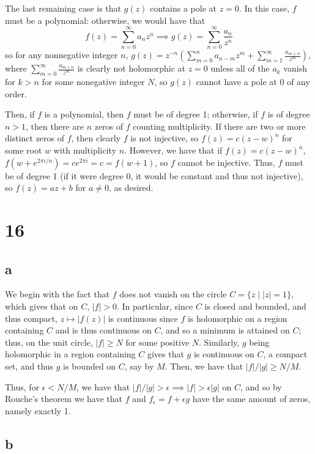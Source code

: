 \documentclass[12pt,letterpaper]{article}
\theoremstyle{definition}
\begin{document}
The last remaining case is that $g(z)$ contains a pole at $z = 0$. In this case, $f$ must be a polynomial: otherwise, we would have that
\[
  f(z) = \sum_{n=0}^{\infty}a_{n}z^{n} \implies g(z) = \sum_{n=0}^{\infty}\frac{a_{n}}{z^{n}}
\]
so for any nonnegative integer $n$, $g(z) = z^{-n}\left(\sum_{m=0}^{n}a_{n-m}z^{m} + \sum_{m=1}^{\infty}\frac{a_{m+n}}{z^{m}}\right)$, where $\sum_{m=0}^{\infty}\frac{a_{m+n}}{z^{m}}$ is clearly not holomorphic at $z = 0$ unless all of the $a_{k}$ vanish for $k > n$ for some nonegative integer $N$, so $g(z)$ cannot have a pole at $0$ of any order.

Then, if $f$ is a polynomial, then $f$ must be of degree 1; otherwise, if $f$ is of degree $n > 1$, then there are $n$ zeros of $f$ counting multiplicity. If there are two or more distinct zeros of $f$, then clearly $f$ is not injective, so $f(z) = c(z - w)^{n}$ for some root $w$ with multiplicity $n$. However, we have that if $f(z) = c(z - w)^{n}$, $f(w + e^{2\pi i / n}) = ce^{2\pi i} = c = f(w + 1)$, so $f$ cannot be injective. Thus, $f$ must be of degree 1 (if it were degree 0, it would be constant and thus not injective), so $f(z) = az + b$ for $a \neq 0$, as desired.


\section*{16}

\subsection*{a}

We begin with the fact that $f$ does not vanish on the circle $C = \{z \mid |z| = 1\}$, which gives that on $C$, $|f| > 0$. In particular, since $C$ is closed and bounded, and thus compact, $z \mapsto |f(z)|$ is continuous since $f$ is holomorphic on a region containing $C$ and is thus continuous on $C$, and so a minimum is attained on $C$; thus, on the unit circle, $|f| \geq N$ for some positive $N$. Similarly, $g$ being holomorphic in a region containing $C$ gives that $g$ is continuous on $C$, a compact set, and thus $g$ is bounded on $C$, say by $M$. Then, we have that $|f|/|g| \geq N/M$.

Thus, for $\epsilon < N/M$, we have that $|f|/|g| > \epsilon \implies |f| > \epsilon |g|$ on $C$, and so by Rouche's theorem we have that $f$ and $f_{\epsilon} = f + \epsilon g$ have the same amount of zeros, namely exactly 1.

\subsection*{b}
\end{document}
